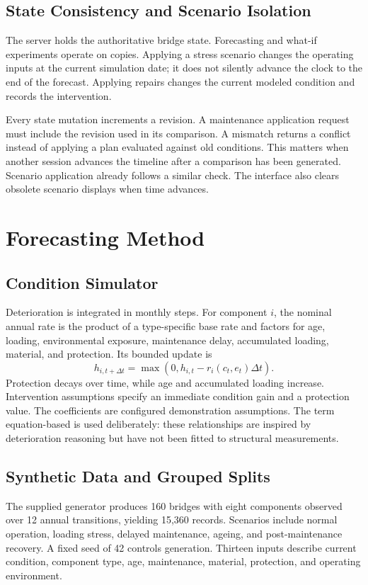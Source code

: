 \documentclass[conference]{IEEEtran}
\begin{document}
\subsection{State Consistency and Scenario Isolation}
The server holds the authoritative bridge state. Forecasting and what-if experiments operate on copies. Applying a stress scenario changes the operating inputs at the current simulation date; it does not silently advance the clock to the end of the forecast. Applying repairs changes the current modeled condition and records the intervention.

Every state mutation increments a revision. A maintenance application request must include the revision used in its comparison. A mismatch returns a conflict instead of applying a plan evaluated against old conditions. This matters when another session advances the timeline after a comparison has been generated. Scenario application already follows a similar check. The interface also clears obsolete scenario displays when time advances.

\section{Forecasting Method}
\subsection{Condition Simulator}
Deterioration is integrated in monthly steps. For component $i$, the nominal annual rate is the product of a type-specific base rate and factors for age, loading, environmental exposure, maintenance delay, accumulated loading, material, and protection. Its bounded update is
\begin{equation}
h_{i,t+\Delta t}=\max(0,h_{i,t}-r_i(c_t,e_t)\Delta t).
\end{equation}
Protection decays over time, while age and accumulated loading increase. Intervention assumptions specify an immediate condition gain and a protection value. The coefficients are configured demonstration assumptions. The term equation-based is used deliberately: these relationships are inspired by deterioration reasoning but have not been fitted to structural measurements.

\subsection{Synthetic Data and Grouped Splits}
The supplied generator produces 160 bridges with eight components observed over 12 annual transitions, yielding 15,360 records. Scenarios include normal operation, loading stress, delayed maintenance, ageing, and post-maintenance recovery. A fixed seed of 42 controls generation. Thirteen inputs describe current condition, component type, age, maintenance, material, protection, and operating environment.
\end{document}
